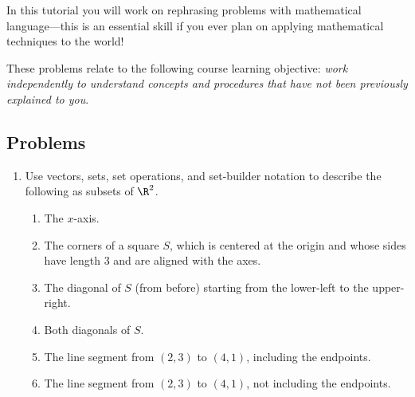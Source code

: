 		\begin{objectives}
			In this tutorial you will work on rephrasing problems
			with mathematical language---this is an essential skill if you ever
			plan on applying mathematical techniques to the world!

			These problems relate to the following course learning
			objective: \textit{work independently to understand concepts and procedures that have not
			been previously explained to you}.
		\end{objectives}



		\subsection*{Problems}


		\begin{enumerate}
			\item Use vectors, sets, set operations, and set-builder notation
				to describe the following as subsets of $\R^2$.
				\begin{enumerate}
					\item The $x$-axis.
					\item The corners of a square $S$, which is centered at the origin and whose
						sides have length 3 and are aligned with the axes.
					\item The diagonal of $S$ (from before) starting from the lower-left to the upper-right.
					\item Both diagonals of $S$.
					\item The line segment from $(2,3)$ to $(4,1)$, including the endpoints.
					\item The line segment from $(2,3)$ to $(4,1)$, not including the endpoints.
				\end{enumerate}


\end{enumerate}

